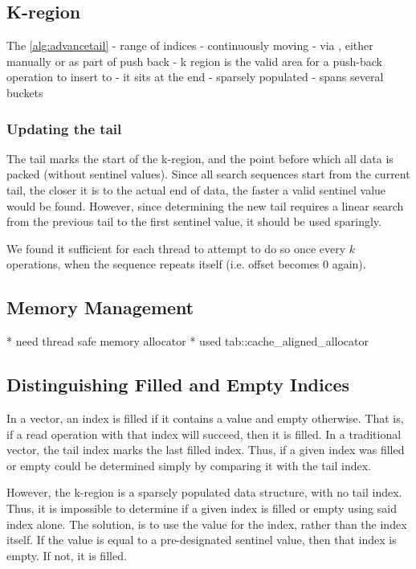 \documentclass{sigplanconf}
\begin{document}
\subsection{K-region}
The \ref{alg:advancetail}
- range of indices
- continuously moving
  - via , either manually or as part of push back
- k region is the valid area for a push-back operation to insert to
- it sits at the end
- sparsely populated
- spans several buckets

\subsubsection{Updating the tail}

The tail marks the start of the k-region, and the point before which
all data is packed (without sentinel values). Since all search sequences
start from the current tail, the closer it is to the actual end of
data, the faster a valid sentinel value would be found. However, since
determining the new tail requires a linear search from the previous
tail to the first sentinel value, it should be used sparingly.

We found it sufficient for each thread to attempt to do so once every
$k$ operations, when the sequence repeats itself (i.e. offset becomes
0 again).

\subsection{Memory Management}
* need thread safe memory allocator
* used tab::cache\_aligned\_allocator

\subsection{Distinguishing Filled and Empty Indices}

In a vector, an index is filled if it contains a value and empty otherwise. That is, if a read operation with that index will succeed, then it is filled. In a traditional vector, the tail index marks the last filled index. Thus, if a given index was filled or empty could be determined simply by comparing it with the tail index.

However, the k-region is a sparsely populated data structure, with no tail index. Thus, it is impossible to determine if a given index is filled or empty using said index alone. The solution, is to use the value for the index, rather than the index itself. If the value is equal to a pre-designated sentinel value, then that index is empty. If not, it is filled.
\end{document}
